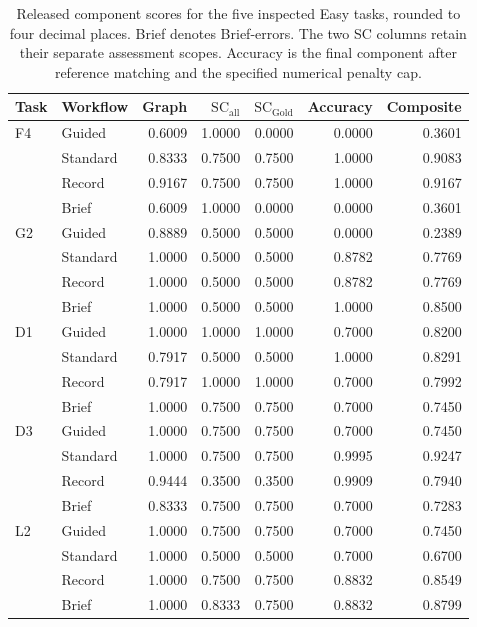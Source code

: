 \begin{table}[!htbp]
\centering
\small
\setlength{\tabcolsep}{4pt}
\caption{Released component scores for the five inspected Easy tasks, rounded to four decimal places. Brief denotes Brief-errors. The two SC columns retain their separate assessment scopes. Accuracy is the final component after reference matching and the specified numerical penalty cap.}
\label{tab:si-easy-case-audit}
\begin{tabular}{llrrrrr}
\toprule
Task & Workflow & Graph & $\mathrm{SC}_{\mathrm{all}}$ & $\mathrm{SC}_{\mathrm{Gold}}$ & Accuracy & Composite \\
\midrule
F4 & Guided & 0.6009 & 1.0000 & 0.0000 & 0.0000 & 0.3601 \\
 & Standard & 0.8333 & 0.7500 & 0.7500 & 1.0000 & 0.9083 \\
 & Record & 0.9167 & 0.7500 & 0.7500 & 1.0000 & 0.9167 \\
 & Brief & 0.6009 & 1.0000 & 0.0000 & 0.0000 & 0.3601 \\
\addlinespace
G2 & Guided & 0.8889 & 0.5000 & 0.5000 & 0.0000 & 0.2389 \\
 & Standard & 1.0000 & 0.5000 & 0.5000 & 0.8782 & 0.7769 \\
 & Record & 1.0000 & 0.5000 & 0.5000 & 0.8782 & 0.7769 \\
 & Brief & 1.0000 & 0.5000 & 0.5000 & 1.0000 & 0.8500 \\
\addlinespace
D1 & Guided & 1.0000 & 1.0000 & 1.0000 & 0.7000 & 0.8200 \\
 & Standard & 0.7917 & 0.5000 & 0.5000 & 1.0000 & 0.8291 \\
 & Record & 0.7917 & 1.0000 & 1.0000 & 0.7000 & 0.7992 \\
 & Brief & 1.0000 & 0.7500 & 0.7500 & 0.7000 & 0.7450 \\
\addlinespace
D3 & Guided & 1.0000 & 0.7500 & 0.7500 & 0.7000 & 0.7450 \\
 & Standard & 1.0000 & 0.7500 & 0.7500 & 0.9995 & 0.9247 \\
 & Record & 0.9444 & 0.3500 & 0.3500 & 0.9909 & 0.7940 \\
 & Brief & 0.8333 & 0.7500 & 0.7500 & 0.7000 & 0.7283 \\
\addlinespace
L2 & Guided & 1.0000 & 0.7500 & 0.7500 & 0.7000 & 0.7450 \\
 & Standard & 1.0000 & 0.5000 & 0.5000 & 0.7000 & 0.6700 \\
 & Record & 1.0000 & 0.7500 & 0.7500 & 0.8832 & 0.8549 \\
 & Brief & 1.0000 & 0.8333 & 0.7500 & 0.8832 & 0.8799 \\
\bottomrule
\end{tabular}
\end{table}

